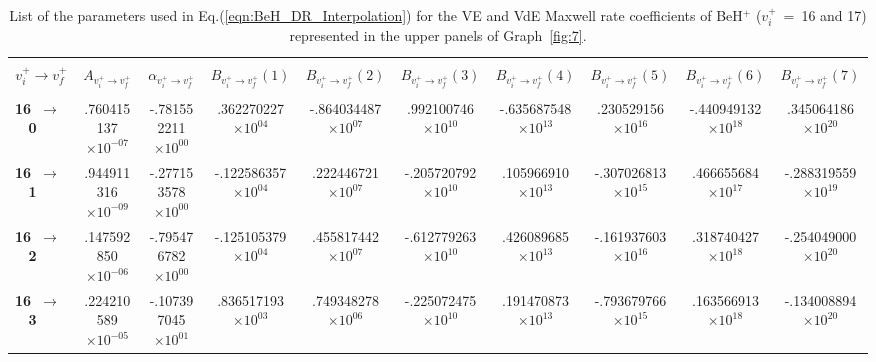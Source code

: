 \documentclass[reviewcopy]{elsarticle}
\begin{document}
\begin{landscape}
\renewcommand{\thefootnote}{\fnsymbol{footnote}}
\renewcommand{\arraystretch}{0.81}
\scriptsize
\setlength\tabcolsep{1.2ex}
\begin{longtable}{lccccccccc}
\caption[table10]{List of the parameters used in Eq.(\ref{eqn:BeH_DR_Interpolation}) for the VE and VdE Maxwell rate coefficients of BeH$^+$  ($v^+_i$~=~16 and 17) represented in the upper panels of Graph~\ref{fig:7}.}\label{tab:BeH_VE_Interpolation16-17}\vspace{0.5cm}\\
\hline \\[-2ex]
   \multicolumn{1}{c}{$v^+_i \to v^+_f$} &
   \multicolumn{1}{c}{$A_{{v^+_i}\to {v^+_f}}$} &
   \multicolumn{1}{c}{$\alpha_{{v^+_i}\to {v^+_f}}$} &
   \multicolumn{1}{c}{$B_{{v^+_i}\to {v^+_f}}(1)$} &
   \multicolumn{1}{c}{$B_{{v^+_i}\to {v^+_f}}(2)$} &
   \multicolumn{1}{c}{$B_{{v^+_i}\to {v^+_f}}(3)$} &
   \multicolumn{1}{c}{$B_{{v^+_i}\to {v^+_f}}(4)$}  &
   \multicolumn{1}{c}{$B_{{v^+_i}\to {v^+_f}}(5)$} &
   \multicolumn{1}{c}{$B_{{v^+_i}\to {v^+_f}}(6)$} &
   \multicolumn{1}{c}{$B_{{v^+_i}\to {v^+_f}}(7)$} \\[5pt]
 \hline \\[-2ex]
\endhead
{\bf 16~$\to$~ 0}   &   .760415137$\times10^{-07}$ & -.781552211$\times10^{ 00}$ &  .362270227$\times10^{ 04}$ & -.864034487$\times10^{ 07}$ &  .992100746$\times10^{ 10}$ & -.635687548$\times10^{ 13}$ &  .230529156$\times10^{ 16}$ & -.440949132$\times10^{ 18}$ &  .345064186$\times10^{ 20}$ \\
{\bf 16~$\to$~ 1}   &   .944911316$\times10^{-09}$ & -.277153578$\times10^{ 00}$ & -.122586357$\times10^{ 04}$ &  .222446721$\times10^{ 07}$ & -.205720792$\times10^{ 10}$ &  .105966910$\times10^{ 13}$ & -.307026813$\times10^{ 15}$ &  .466655684$\times10^{ 17}$ & -.288319559$\times10^{ 19}$ \\
{\bf 16~$\to$~ 2}   &   .147592850$\times10^{-06}$ & -.795476782$\times10^{ 00}$ & -.125105379$\times10^{ 04}$ &  .455817442$\times10^{ 07}$ & -.612779263$\times10^{ 10}$ &  .426089685$\times10^{ 13}$ & -.161937603$\times10^{ 16}$ &  .318740427$\times10^{ 18}$ & -.254049000$\times10^{ 20}$ \\
{\bf 16~$\to$~ 3}   &   .224210589$\times10^{-05}$ & -.107397045$\times10^{ 01}$ &  .836517193$\times10^{ 03}$ &  .749348278$\times10^{ 06}$ & -.225072475$\times10^{ 10}$ &  .191470873$\times10^{ 13}$ & -.793679766$\times10^{ 15}$ &  .163566913$\times10^{ 18}$ & -.134008894$\times10^{ 20}$ \\

\end{longtable}
\end{landscape}
\end{document}
